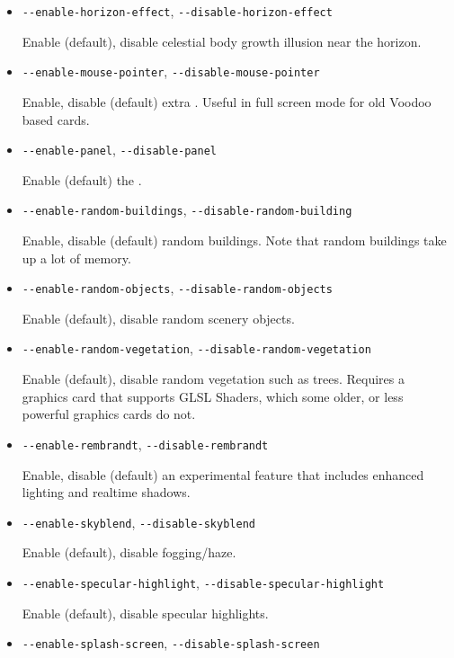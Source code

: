 {\begin{itemize}
  \item{\texttt{-$ $-enable-horizon-effect}, \texttt{-$ $-disable-horizon-effect}}

  Enable (default), disable celestial body growth illusion near the horizon.

  \item{\texttt{-$ $-enable-mouse-pointer}, \texttt{-$ $-disable-mouse-pointer}}

  Enable, disable (default) extra . Useful in full screen mode for old Voodoo based cards.

  \item{\texttt{-$ $-enable-panel}, \texttt{-$ $-disable-panel}}

  Enable (default) the .

  \item{\texttt{-$ $-enable-random-buildings}, \texttt{-$ $-disable-random-building}}

  Enable, disable (default) random buildings. Note that random buildings take up a lot of memory.

  \item{\texttt{-$ $-enable-random-objects}, \texttt{-$ $-disable-random-objects}}

  Enable (default), disable random scenery objects.

  \item{\texttt{-$ $-enable-random-vegetation}, \texttt{-$ $-disable-random-vegetation}}

  Enable (default), disable random vegetation such as trees. Requires a graphics card that
  supports GLSL Shaders, which some older, or less powerful graphics cards do not.

  \item{\texttt{-$ $-enable-rembrandt}, \texttt{-$ $-disable-rembrandt}}

  Enable, disable (default) an experimental feature that includes
   enhanced lighting and realtime shadows.

  \item{\texttt{-$ $-enable-skyblend}, \texttt{-$ $-disable-skyblend}}

  Enable (default), disable fogging/haze.

  \item{\texttt{-$ $-enable-specular-highlight}, \texttt{-$ $-disable-specular-highlight}}

  Enable (default), disable specular highlights.

  \item{\texttt{-$ $-enable-splash-screen}, \texttt{-$ $-disable-splash-screen}}


\end{itemize}}
